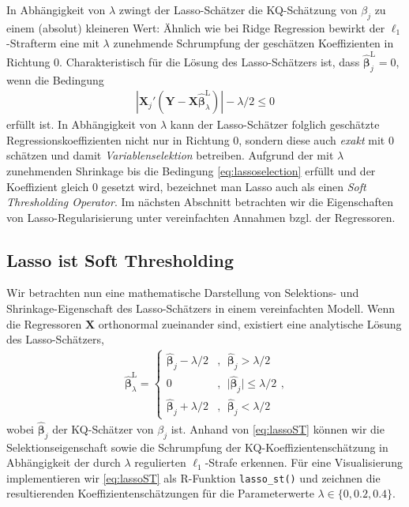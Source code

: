 \documentclass[
  a4paper,
  DIV=11,
  oneside]{scrreprt}
\begin{document}
In Abhängigkeit von \(\lambda\) zwingt der Lasso-Schätzer die
KQ-Schätzung von \(\beta_j\) zu einem (absolut) kleineren Wert: Ähnlich
wie bei Ridge Regression bewirkt der \(\ell_1\)-Strafterm eine mit
\(\lambda\) zunehmende Schrumpfung der geschätzen Koeffizienten in
Richtung 0. Charakteristisch für die Lösung des Lasso-Schätzers ist,
dass \(\widehat{\boldsymbol{\beta}}^{\mathrm{L}}_j = 0\), wenn die
Bedingung \begin{align}
  \left\lvert\boldsymbol{X}_j'(\boldsymbol{Y} - \boldsymbol{X}\widehat{\boldsymbol{\beta}}^{\mathrm{L}}_\lambda)\right\rvert - \lambda/2 \leq 0 \label{eq:lassoselection}
\end{align} erfüllt ist. In Abhängigkeit von \(\lambda\) kann der
Lasso-Schätzer folglich geschätzte Regressionskoeffizienten nicht nur in
Richtung \(0\), sondern diese auch \emph{exakt} mit \(0\) schätzen und
damit \emph{Variablenselektion} betreiben. Aufgrund der mit \(\lambda\)
zunehmenden Shrinkage bis die Bedingung \eqref{eq:lassoselection}
erfüllt und der Koeffizient gleich \(0\) gesetzt wird, bezeichnet man
Lasso auch als einen \emph{Soft Thresholding Operator}. Im nächsten
Abschnitt betrachten wir die Eigenschaften von Lasso-Regularisierung
unter vereinfachten Annahmen bzgl. der Regressoren.

\subsection{Lasso ist Soft
Thresholding}\label{lasso-ist-soft-thresholding}

Wir betrachten nun eine mathematische Darstellung von Selektions- und
Shrinkage-Eigenschaft des Lasso-Schätzers in einem vereinfachten Modell.
Wenn die Regressoren \(\boldsymbol{X}\) orthonormal zueinander sind,
existiert eine analytische Lösung des Lasso-Schätzers, \begin{align}
  \widehat{\boldsymbol{\beta}}^{\mathrm{L}}_\lambda =
  \begin{cases}
    \widehat{\boldsymbol{\beta}}_j - \lambda/2 &, \ \ \widehat{\boldsymbol{\beta}}_j > \lambda/2\\
    0 &, \ \ \lvert\widehat{\boldsymbol{\beta}}_j\rvert\leq\lambda/2\\
    \widehat{\boldsymbol{\beta}}_j + \lambda/2 &, \ \ \widehat{\boldsymbol{\beta}}_j < \lambda/2
  \end{cases},\label{eq:lassoST}
\end{align} wobei \(\widehat{\boldsymbol{\beta}}_j\) der KQ-Schätzer von
\(\beta_j\) ist. Anhand von \eqref{eq:lassoST} können wir die
Selektionseigenschaft sowie die Schrumpfung der
KQ-Koeffizientenschätzung in Abhängigkeit der durch \(\lambda\)
regulierten \(\ell_1\)-Strafe erkennen. Für eine Visualisierung
implementieren wir \eqref{eq:lassoST} als R-Funktion
\texttt{lasso\_st()} und zeichnen die resultierenden
Koeffizientenschätzungen für die Parameterwerte
\(\lambda\in\{0, 0.2, 0.4\}\).
\end{document}
